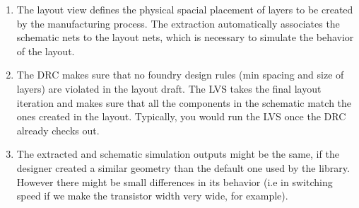 \documentclass{article}
\begin{document}
\begin{prob}
	\begin{enumerate}
	\item The layout view defines the physical spacial placement of layers to be created by the manufacturing process.
	The extraction automatically associates the schematic nets to the layout nets, which is necessary to simulate the behavior of the layout.
	
\item The DRC makes sure that no foundry design rules (min spacing and size of layers) are violated in the layout draft.
	The LVS takes the final layout iteration and makes sure that all the components in the schematic match the ones created in the layout. Typically, you would run the LVS once the DRC already checks out.

\item The extracted and schematic simulation outputs might be the same, if the designer created a similar geometry than the default one used by the library. 
	However there might be small differences in its behavior (i.e in switching speed if we make the transistor width very wide, for example).


\end{enumerate}
\end{prob}
\end{document}

